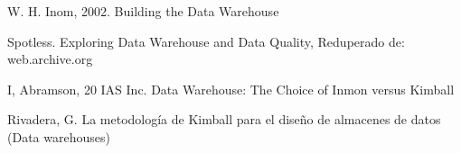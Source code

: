 \documentclass[twoside,twocolumn]{article}
\begin{document}
\newpage



\begin{thebibliography}{99} 

\bibitem[1]{}
\newblock W. H. Inom, 2002. Building the Data Warehouse

\bibitem[2]{}
\newblock Spotless. Exploring Data Warehouse and Data Quality, Reduperado de: web.archive.org

\bibitem[3]{}
\newblock I, Abramson, 20 IAS Inc. Data Warehouse: The Choice of Inmon versus Kimball

\bibitem[4]{}
\newblock Rivadera, G. La metodología de Kimball para el diseño de almacenes de
datos (Data warehouses) 

\end{thebibliography}


\end{document}
